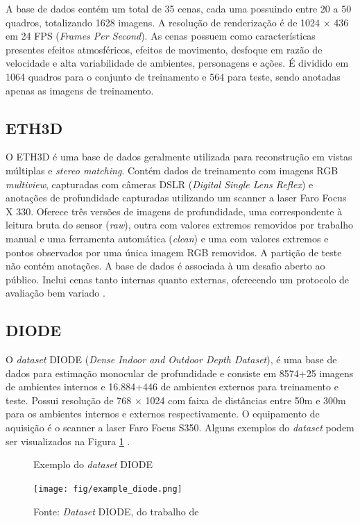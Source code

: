 A base de dados contém um total de 35 cenas, cada uma possuindo entre 20 a 50 quadros, totalizando 1628 imagens. A resolução de renderização é de 1024 $\times$ 436 em 24 FPS (\textit{Frames Per Second}). As cenas possuem como características presentes efeitos atmosféricos, efeitos de movimento, desfoque em razão de velocidade e alta variabilidade de ambientes, personagens e ações. É dividido em 1064 quadros para o conjunto de treinamento e 564 para teste, sendo anotadas apenas as imagens de treinamento. 

\subsection{ETH3D}

O ETH3D é uma base de dados geralmente utilizada para reconstrução em vistas múltiplas e \textit{stereo matching}. Contém dados de treinamento com imagens RGB \textit{multiview}, capturadas com câmeras DSLR (\textit{Digital Single Lens Reflex}) e anotações de profundidade capturadas utilizando um scanner a laser Faro Focus X 330. Oferece três versões de imagens de profundidade, uma correspondente à leitura bruta do sensor (\textit{raw}), outra com valores extremos removidos por trabalho manual e uma ferramenta automática (\textit{clean}) e uma com valores extremos e pontos observados por uma única imagem RGB removidos. A partição de teste não contém anotações. A base de dados é associada à um desafio aberto ao público. Inclui cenas tanto internas quanto externas, oferecendo um protocolo de avaliação bem variado \cite{lahiri2024deep} \cite{schops2019bad}. 

\subsection{DIODE}

O \textit{dataset} DIODE (\textit{Dense Indoor and Outdoor Depth Dataset}), é uma base de dados para estimação monocular de profundidade e consiste em 8574+25 imagens de ambientes internos e 16.884+446 de ambientes externos para treinamento e teste. Possui resolução de 768 $\times$ 1024 com faixa de distâncias entre 50m e 300m para os ambientes internos e externos respectivamente. O equipamento de aquisição é o scanner a laser Faro Focus S350. Alguns exemplos do \textit{dataset} podem ser visualizados na Figura \ref{exdiode} \cite{diode_dataset}.

\begin{figure}[h]
    \centering
    \caption{Exemplo do \textit{dataset} DIODE}
    \texttt{[image: fig/example\_diode.png]}
    \caption*{Fonte: \textit{Dataset} DIODE, do trabalho de }
    \label{exdiode}
\end{figure}

